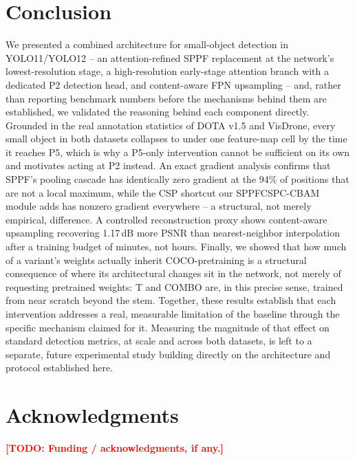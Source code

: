 \documentclass[conference]{IEEEtran}
\newcommand{\todo}[1]{\textcolor{red}{\textbf{[TODO: #1]}}}
\begin{document}
\section{Conclusion}
\label{sec:conclusion}

We presented a combined architecture for small-object detection in
YOLO11/YOLO12 -- an attention-refined SPPF replacement at the network's
lowest-resolution stage, a high-resolution early-stage attention branch
with a dedicated P2 detection head, and content-aware FPN upsampling --
and, rather than reporting benchmark numbers before the mechanisms behind
them are established, we validated the reasoning behind each component
directly. Grounded in the real annotation statistics of DOTA v1.5 and
VisDrone, every small object in both datasets collapses to under one
feature-map cell by the time it reaches P5, which is why a P5-only
intervention cannot be sufficient on its own and motivates acting at P2
instead. An exact gradient analysis confirms that SPPF's pooling cascade
has identically zero gradient at the 94\% of positions that are not a
local maximum, while the CSP shortcut our SPPFCSPC-CBAM module adds has
nonzero gradient everywhere -- a structural, not merely empirical,
difference. A controlled reconstruction proxy shows content-aware
upsampling recovering 1.17\,dB more PSNR than nearest-neighbor
interpolation after a training budget of minutes, not hours. Finally, we
showed that how much of a variant's weights actually inherit
COCO-pretraining is a structural consequence of where its architectural
changes sit in the network, not merely of requesting pretrained weights:
T and COMBO are, in this precise sense, trained from near scratch beyond
the stem. Together, these results establish that each intervention
addresses a real, measurable limitation of the baseline through the
specific mechanism claimed for it. Measuring the magnitude of that effect
on standard detection metrics, at scale and across both datasets, is left
to a separate, future experimental study building directly on the
architecture and protocol established here.

\section*{Acknowledgments}
\todo{Funding / acknowledgments, if any.}
\end{document}
